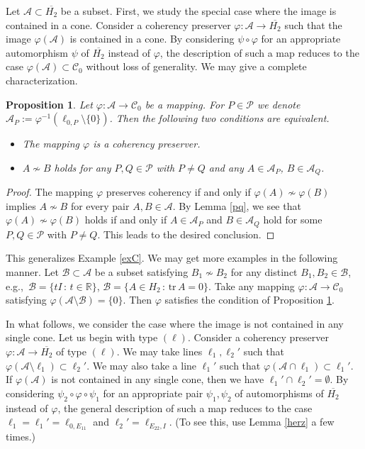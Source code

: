 \documentclass[10pt]{amsart}
\newtheorem{proposition}[theorem]{Proposition}
\theoremstyle{definition}
\theoremstyle{remark}
\numberwithin{subsection}{section}
\numberwithin{equation}{section}
\newcommand\cA{{\mathcal{A}}}
\newcommand\cC{{\mathcal{C}}}
\newcommand\cP{{\mathcal{P}}}
\newcommand\bR{{\mathbb{R}}}
\newcommand\oH{{\overline{H_2}}}
\begin{document}
Let $\mathcal{A}\subset \oH$ be a subset.
First, we study the special case where the image is contained in a cone. 
Consider a coherency preserver $\varphi\colon \mathcal{A}\to \oH$ such that the image $\varphi(\mathcal{A})$ is contained in a cone. 
By considering $\psi\circ \varphi$ for an appropriate automorphism $\psi$ of $\oH$ instead of $\varphi$, the description of such a map reduces to the case $\varphi(\mathcal{A})\subset \mathcal{C}_0$ without loss of generality.
We may give a complete characterization. 
 
\begin{proposition}\label{genC}
Let $\varphi\colon \mathcal{A}\to \mathcal{C}_0$ be a mapping. For $P\in \cP$ we denote $\mathcal{A}_P :=\varphi^{-1}(\ell_{0, P}\setminus \{0\})$. Then the following two conditions are equivalent. 
\begin{itemize}
\item The mapping $\varphi$ is a coherency preserver. 
\item $A\not\sim B$ holds for any $P,Q\in \cP$ with $P\neq Q$ and any $A\in \mathcal{A}_P$, $B\in \mathcal{A}_Q$.
\end{itemize}
\end{proposition}
\begin{proof}
The mapping $\varphi$ preserves coherency if and only if $\varphi(A)\not\sim \varphi(B)$ implies $A\not\sim B$ for every pair $A, B\in \cA$. 
By Lemma \ref{pq}, we see that $\varphi(A)\not\sim \varphi(B)$ holds if and only if $A\in \mathcal{A}_P$ and $B\in \mathcal{A}_Q$ hold for some $P,Q\in \cP$ with $P\neq Q$.
This leads to the desired conclusion.
\end{proof}

This generalizes Example \ref{exC}.
We may get more examples in the following manner. 
Let $\mathcal{B}\subset\mathcal{A}$ be a subset satisfying $B_1\not\sim B_2$ for any distinct $B_1, B_2\in \mathcal{B}$, e.g.,\ $\mathcal{B}=\{tI\,:\, t\in \bR\}$, $\mathcal{B}=\{A\in H_2\,:\, \mathrm{tr}\,A =0\}$.
Take any mapping $\varphi\colon \mathcal{A}\to\cC_0$ satisfying $\varphi(\mathcal{A}\setminus\mathcal{B})=\{0\}$. 
Then $\varphi$ satisfies the condition of Proposition \ref{genC}.

In what follows, we consider the case where the image is not contained in any single cone. 
Let us begin with type $(\ell)$. 
Consider a coherency preserver $\varphi\colon \mathcal{A}\to \oH$ of type $(\ell)$. 
We may take lines $\ell_1, \ell_2'$ such that $\varphi(\mathcal{A}\setminus \ell_1)\subset \ell_2'$. 
We may also take a line $\ell_1'$ such that $\varphi(\mathcal{A}\cap \ell_1)\subset \ell_1'$. 
If $\varphi(\mathcal{A})$ is not contained in any single cone, then we have $\ell_1'\cap\ell_2'=\emptyset$. 
By considering $\psi_2\circ \varphi\circ\psi_1$ for an appropriate pair $\psi_1, \psi_2$ of automorphisms of $\oH$ instead of $\varphi$, the general description of such a map reduces to the case $\ell_1=\ell_1'=\ell_{0, E_{11}}$ and $\ell_2'=\ell_{E_{22}, I}$. (To see this, use Lemma \ref{herz} a few times.)
\end{document}
